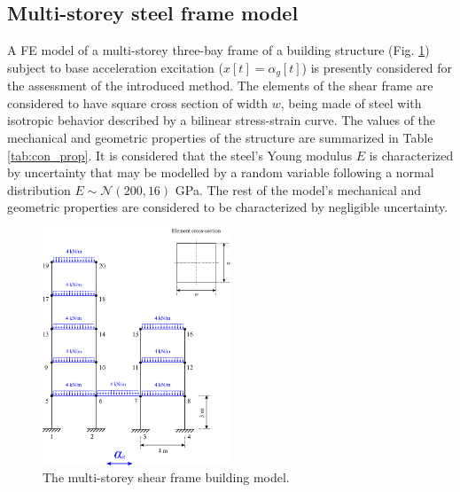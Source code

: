 \documentclass[preprint,3p,review,times,11pt]{elsarticle}
\begin{document}
\subsection{Multi-storey steel frame model}
A FE model of a multi-storey three-bay frame of a building structure (Fig. \ref{fig:SteelFrame}) subject to base acceleration excitation ($x[t] =\alpha_{g}[t] $) is presently considered for the assessment of the introduced method. The elements of the shear frame are considered to have square cross section of width $w$, being made of steel with isotropic behavior described by a bilinear stress-strain curve. The values of the mechanical and geometric properties of the structure are summarized in Table \ref{tab:con_prop}. It is considered that the steel's Young modulus $E$ is characterized by uncertainty that may be modelled by a random variable following a normal distribution $ E \sim {\mathcal N}(200,16)$ GPa. The rest of the model's mechanical and geometric properties are considered to be characterized by negligible uncertainty.


\begin{figure}[t]
\centering\includegraphics[width = 0.5\textwidth]{figs/multistoreySF.pdf}
\caption{The multi-storey shear frame building model.}\label{fig:SteelFrame}
\end{figure}
\end{document}
